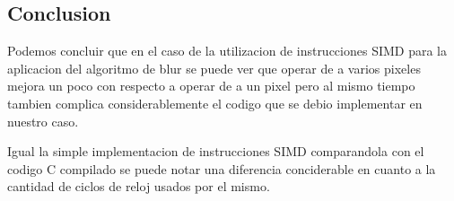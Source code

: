 



\subsection{Conclusion}
Podemos concluir que en el caso de la utilizacion de instrucciones SIMD para la aplicacion del algoritmo de blur se puede ver que operar de a varios pixeles mejora un poco con respecto a operar de a un pixel pero al mismo tiempo tambien complica considerablemente el codigo que se debio implementar en nuestro caso.

Igual la simple implementacion de instrucciones SIMD comparandola con el codigo C compilado se puede notar una diferencia conciderable en cuanto a la cantidad de ciclos de reloj usados por el mismo.


